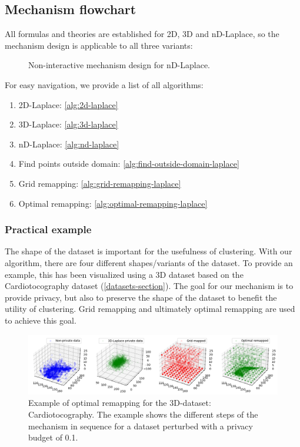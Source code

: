 \subsection{Mechanism flowchart}
All formulas and theories are established for 2D, 3D and nD-Laplace, so the mechanism design is applicable to all three variants:
\begin{figure}[H]
    
    \caption{Non-interactive mechanism design for nD-Laplace.}
    \label{fig:final-mechanism-design}
\end{figure}

For easy navigation, we provide a list of all algorithms:
\begin{enumerate}
    \item 2D-Laplace:  \ref{alg:2d-laplace}
    \item 3D-Laplace: \ref{alg:3d-laplace}
    \item nD-Laplace: \ref{alg:nd-laplace}
    \item Find points outside domain: \ref{alg:find-outside-domain-laplace}
    \item Grid remapping: \ref{alg:grid-remapping-laplace}
    \item Optimal remapping: \ref{alg:optimal-remapping-laplace}
\end{enumerate}
\subsubsection{Practical example}
The shape of the dataset is important for the usefulness of clustering.
With our algorithm, there are four different shapes/variants of the dataset.
To provide an example, this has been visualized using a 3D dataset based on the Cardiotocography dataset (\ref{datasets-section}).
The goal for our mechanism is to provide privacy, but also to preserve the shape of the dataset to benefit the utility of clustering.
Grid remapping and ultimately optimal remapping are used to achieve this goal.

\begin{figure}[H]
    \includegraphics[width=1.1\textwidth]{TheorethicalFramework/ND-Laplace/Images/optimal-remapping-example.png}
    \caption{Example of optimal remapping for the 3D-dataset: Cardiotocography. The example shows the different steps of the mechanism in sequence for a dataset perturbed with a privacy budget of 0.1.}
\end{figure}

